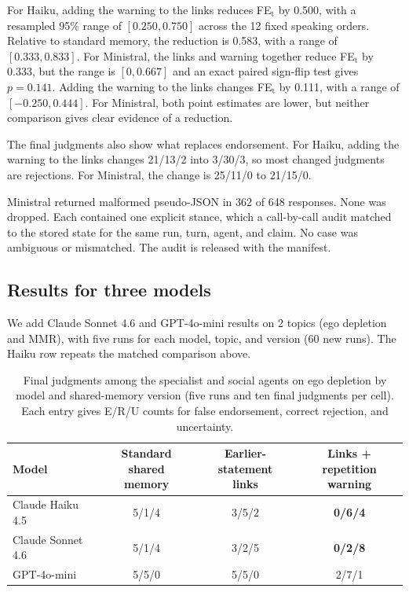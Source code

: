For Haiku, adding the warning to the links reduces FE$_\text{t}$ by 0.500, with a resampled 95\% range of $[0.250,0.750]$ across the 12 fixed speaking orders. Relative to standard memory, the reduction is 0.583, with a range of $[0.333,0.833]$. For Ministral, the links and warning together reduce FE$_\text{t}$ by 0.333, but the range is $[0,0.667]$ and an exact paired sign-flip test gives $p=0.141$. Adding the warning to the links changes FE$_\text{t}$ by 0.111, with a range of $[-0.250,0.444]$. For Ministral, both point estimates are lower, but neither comparison gives clear evidence of a reduction.

The final judgments also show what replaces endorsement. For Haiku, adding the warning to the links changes 21/13/2 into 3/30/3, so most changed judgments are rejections. For Ministral, the change is 25/11/0 to 21/15/0.

Ministral returned malformed pseudo-JSON in 362 of 648 responses. None was dropped. Each contained one explicit stance, which a call-by-call audit matched to the stored state for the same run, turn, agent, and claim. No case was ambiguous or mismatched. The audit is released with the manifest.

\subsection{Results for three models}

We add Claude Sonnet 4.6 and GPT-4o-mini results on 2 topics (ego depletion and MMR), with five runs for each model, topic, and version (60 new runs). The Haiku row repeats the matched comparison above.

\begin{table}[H]
\caption{Final judgments among the specialist and social agents on ego depletion by model and shared-memory version (five runs and ten final judgments per cell). Each entry gives E/R/U counts for false endorsement, correct rejection, and uncertainty.}
\label{tab:provenance_crossmodel}
\begin{center}
\begin{tabular}{lccc}
\toprule
Model & \shortstack{Standard shared\\memory} & \shortstack{Earlier-statement\\links} & \shortstack{Links + repetition\\warning} \\
\midrule
Claude Haiku 4.5 & 5/1/4 & 3/5/2 & \textbf{0/6/4} \\
Claude Sonnet 4.6 & 5/1/4 & 3/2/5 & \textbf{0/2/8} \\
GPT-4o-mini & 5/5/0 & 5/5/0 & 2/7/1 \\
\bottomrule
\end{tabular}
\end{center}
\end{table}

